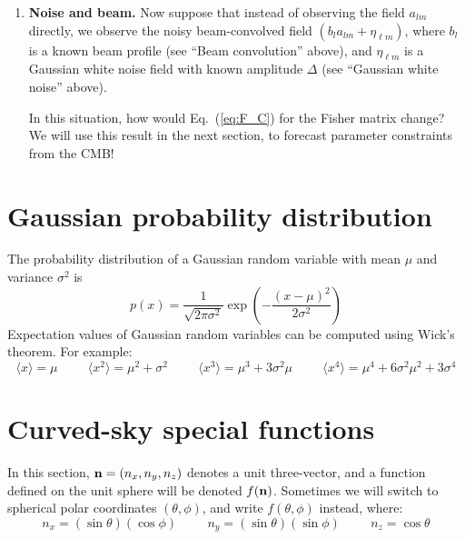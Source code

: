 \documentclass[aps,prd,superscriptaddress,groupedaddress,nofootinbib,nobibnotes]{revtex4}
\newcommand{\be}{\begin{equation}}
\newcommand{\ee}{\end{equation}}
\def\n{{\bf n}}
\begin{document}
\begin{enumerate}
\item {\bf Noise and beam.}
 Now suppose that instead of observing the field $a_{lm}$ directly, we observe the noisy beam-convolved field $(b_l a_{lm} + \eta_{\ell m})$,
 where $b_l$ is a known beam profile (see ``Beam convolution'' above), and $\eta_{\ell m}$ is a Gaussian white noise field with known
 amplitude $\Delta$ (see ``Gaussian white noise'' above).

 In this situation, how would Eq.~(\ref{eq:F_C}) for the Fisher matrix change?
 We will use this result in the next section, to forecast parameter constraints from the CMB!

\end{enumerate}

\clearpage

\appendix

\section{Gaussian probability distribution}
\label{app:gaussian}

\par\noindent
The probability distribution of a Gaussian random variable with mean $\mu$ and variance $\sigma^2$ is
\be
p(x) = \frac{1}{\sqrt{2\pi\sigma^2}} \exp\left( - \frac{(x-\mu)^2}{2\sigma^2} \right)
\ee
Expectation values of Gaussian random variables can be computed using Wick's theorem.
For example:
\be
\langle x \rangle = \mu
  \hspace{1cm}
\langle x^2 \rangle = \mu^2 + \sigma^2
  \hspace{1cm}
\langle x^3 \rangle = \mu^3 + 3 \sigma^2 \mu
  \hspace{1cm}
\langle x^4 \rangle = \mu^4 + 6 \sigma^2 \mu^2 + 3 \sigma^4
\ee

\section{Curved-sky special functions}
\label{app:curved_sky}

In this section, $\n = (n_x, n_y, n_z)$ denotes a unit three-vector, and a function
defined on the unit sphere will be denoted $f(\n)$.  Sometimes we will switch to 
spherical polar coordinates $(\theta,\phi)$, and write $f(\theta,\phi)$ instead,
where:
\be
n_x = (\sin\theta)(\cos\phi)
  \hspace{1cm}
n_y = (\sin\theta)(\sin\phi)
  \hspace{1cm}
n_z = \cos\theta
\ee
\end{document}
